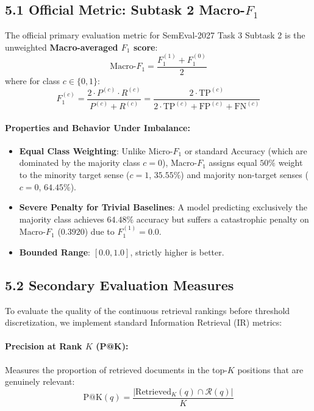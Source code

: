 \subsection{5.1 Official Metric: Subtask 2 Macro-$F_1$}
The official primary evaluation metric for SemEval-2027 Task 3 Subtask 2 is the unweighted \textbf{Macro-averaged $F_1$ score}:
\begin{equation}
    \text{Macro-}F_1 = \frac{F_1^{(1)} + F_1^{(0)}}{2}
\end{equation}
where for class $c \in \{0, 1\}$:
\begin{equation}
    F_1^{(c)} = \frac{2 \cdot P^{(c)} \cdot R^{(c)}}{P^{(c)} + R^{(c)}} = \frac{2 \cdot \text{TP}^{(c)}}{2 \cdot \text{TP}^{(c)} + \text{FP}^{(c)} + \text{FN}^{(c)}}
\end{equation}
\paragraph{Properties and Behavior Under Imbalance:}
\begin{itemize}
    \item \textbf{Equal Class Weighting}: Unlike Micro-$F_1$ or standard Accuracy (which are dominated by the majority class $c=0$), Macro-$F_1$ assigns equal $50\%$ weight to the minority target sense ($c=1$, $35.55\%$) and majority non-target senses ($c=0$, $64.45\%$).
    \item \textbf{Severe Penalty for Trivial Baselines}: A model predicting exclusively the majority class achieves $64.48\%$ accuracy but suffers a catastrophic penalty on Macro-$F_1$ ($0.3920$) due to $F_1^{(1)} = 0.0$.
    \item \textbf{Bounded Range}: $[0.0, 1.0]$, strictly higher is better.
\end{itemize}

\subsection{5.2 Secondary Evaluation Measures}
To evaluate the quality of the continuous retrieval rankings before threshold discretization, we implement standard Information Retrieval (IR) metrics:

\paragraph{Precision at Rank $K$ (P@K):}
Measures the proportion of retrieved documents in the top-$K$ positions that are genuinely relevant:
\begin{equation}
    \text{P@K}(q) = \frac{|\text{Retrieved}_K(q) \cap \mathcal{R}(q)|}{K}
\end{equation}


